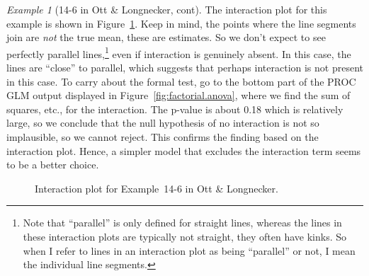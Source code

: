 \documentclass[a4paper, 12pt]{article}
\theoremstyle{plain}
\theoremstyle{definition}
\theoremstyle{remark}
\newtheorem*{example}{Example}
\begin{document}
\begin{example}[14-6 in Ott \& Longnecker, cont]
The interaction plot for this example is shown in Figure~\ref{fig:factorial.interaction}.  Keep in mind, the points where the line segments join are {\em not} the true mean, these are estimates.  So we don't expect to see perfectly parallel lines,\footnote{Note that ``parallel'' is only defined for straight lines, whereas the lines in these interaction plots are typically not straight, they often have kinks.  So when I refer to lines in an interaction plot as being ``parallel'' or not, I mean the individual line segments.} even if interaction is genuinely absent.  In this case, the lines are ``close'' to parallel, which suggests that perhaps interaction is not present in this case.  To carry about the formal test, go to the bottom part of the PROC GLM output displayed in Figure~\ref{fig:factorial.anova}, where we find the sum of squares, etc., for the interaction.  The p-value is about 0.18 which is relatively large, so we conclude that the null hypothesis of no interaction is not so implausible, so we cannot reject.  This confirms the finding based on the interaction plot.  Hence, a simpler model that excludes the interaction term seems to be a better choice.  
\end{example}

\begin{figure}[t]
\begin{center}
\end{center}
\caption{Interaction plot for Example~14-6 in Ott \& Longnecker.}
\label{fig:factorial.interaction}
\end{figure}
\end{document}
